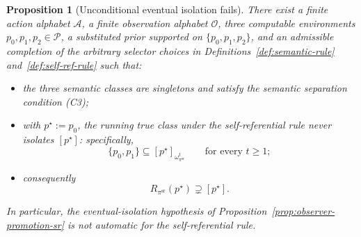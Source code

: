 \documentclass[11pt]{article}
\newtheorem{proposition}[theorem]{Proposition}
\theoremstyle{definition}
\theoremstyle{remark}
\newcommand{\Acal}{\mathcal{A}}
\newcommand{\Ocal}{\mathcal{O}}
\newcommand{\Pcal}{\mathcal{P}}
\begin{document}
\begin{proposition}[Unconditional eventual isolation fails]
\label{prop:self-ref-obstruction}
There exist a finite action alphabet $\Acal$, a finite observation alphabet $\Ocal$, three computable environments $p_0,p_1,p_2\in\Pcal$, a substituted prior supported on $\{p_0,p_1,p_2\}$, and an admissible completion of the arbitrary selector choices in Definitions~\ref{def:semantic-rule} and~\ref{def:self-ref-rule} such that:
\begin{itemize}
\item[(i)] the three semantic classes are singletons and satisfy the semantic separation condition \textup{(C3)};
\item[(ii)] with $p^\star:=p_0$, the running true class under the self-referential rule never isolates $[p^\star]$: specifically,
\[
\{p_0,p_1\}\subseteq [p^\star]_{\omega_{\pi^{\mathrm{sr}}}^t}
\qquad\text{for every }t\ge 1;
\]
\item[(iii)] consequently
\[
R_{\pi^{\mathrm{sr}}}(p^\star)\supsetneq [p^\star].
\]
\end{itemize}
In particular, the eventual-isolation hypothesis of Proposition~\ref{prop:observer-promotion-sr} is not automatic for the self-referential rule.
\end{proposition}
\end{document}
